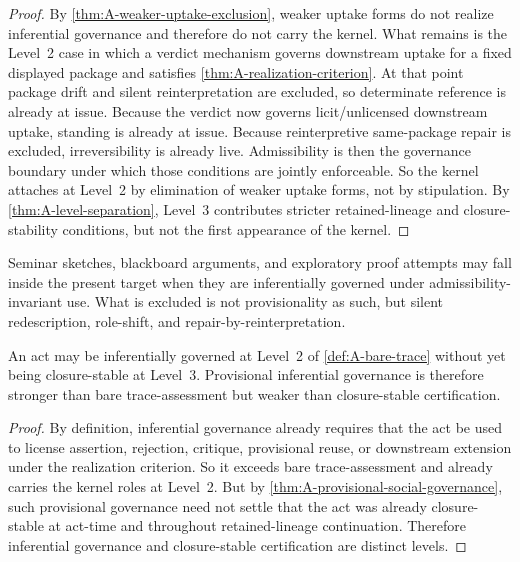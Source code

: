 \begin{proof}
By \cref{thm:A-weaker-uptake-exclusion}, weaker uptake forms do not realize inferential governance and therefore do not carry the kernel. What remains is the Level~2 case in which a verdict mechanism governs downstream uptake for a fixed displayed package and satisfies \cref{thm:A-realization-criterion}. At that point package drift and silent reinterpretation are excluded, so determinate reference is already at issue. Because the verdict now governs licit/unlicensed downstream uptake, standing is already at issue. Because reinterpretive same-package repair is excluded, irreversibility is already live. Admissibility is then the governance boundary under which those conditions are jointly enforceable. So the kernel attaches at Level~2 by elimination of weaker uptake forms, not by stipulation. By \cref{thm:A-level-separation}, Level~3 contributes stricter retained-lineage and closure-stability conditions, but not the first appearance of the kernel.
\end{proof}

\begin{remark}
Seminar sketches, blackboard arguments, and exploratory proof attempts may fall inside the present target when they are inferentially governed under admissibility-invariant use. What is excluded is not provisionality as such, but silent redescription, role-shift, and repair-by-reinterpretation.
\end{remark}

\begin{theorem}
\label{thm:A-provisional-not-closure}
An act may be inferentially governed at Level~2 of \cref{def:A-bare-trace} without yet being closure-stable at Level~3. Provisional inferential governance is therefore stronger than bare trace-assessment but weaker than closure-stable certification.
\end{theorem}

\begin{proof}
By definition, inferential governance already requires that the act be used to license assertion, rejection, critique, provisional reuse, or downstream extension under the realization criterion. So it exceeds bare trace-assessment and already carries the kernel roles at Level~2. But by \cref{thm:A-provisional-social-governance}, such provisional governance need not settle that the act was already closure-stable at act-time and throughout retained-lineage continuation. Therefore inferential governance and closure-stable certification are distinct levels.
\end{proof}

